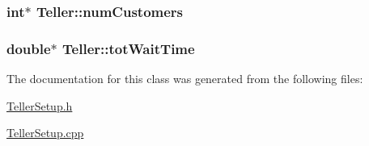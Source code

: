 \subsubsection[{\texorpdfstring{num\+Customers}{numCustomers}}]{\setlength{\rightskip}{0pt plus 5cm}int$\ast$ Teller\+::num\+Customers\hspace{0.3cm}{\ttfamily [protected]}}\hypertarget{class_teller_aeb31b3f7b01ecc86be2aecf9899d29cd}{}\label{class_teller_aeb31b3f7b01ecc86be2aecf9899d29cd}
\subsubsection[{\texorpdfstring{tot\+Wait\+Time}{totWaitTime}}]{\setlength{\rightskip}{0pt plus 5cm}double$\ast$ Teller\+::tot\+Wait\+Time\hspace{0.3cm}{\ttfamily [protected]}}\hypertarget{class_teller_a0fe70e6fab108e4f1f478835d0856b38}{}\label{class_teller_a0fe70e6fab108e4f1f478835d0856b38}


The documentation for this class was generated from the following files\+:\begin{DoxyCompactItemize}
\item 
\hyperlink{_teller_setup_8h}{Teller\+Setup.\+h}\item 
\hyperlink{_teller_setup_8cpp}{Teller\+Setup.\+cpp}\end{DoxyCompactItemize}
